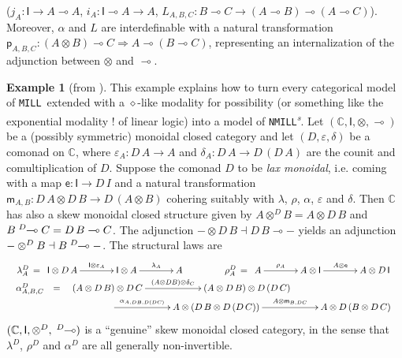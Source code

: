 \documentclass[submission,copyright,creativecommons]{eptcs}
\theoremstyle{definition}
\newtheorem{example}{Example}[section]
\newcommand{\ot}{\otimes}
\newcommand{\lolli}{\multimap}
\newcommand{\I}{\mathsf{I}}
\newcommand{\otd}{\ot^D}
\newcommand{\lollid}{\;\textsuperscript{$D$}\!\!\lolli}
\newcommand{\MILL}{\texttt{MILL}}
\newcommand{\NMILL}{\texttt{NMILL}}
\newcommand{\SkNMILL}{\NMILL\textsuperscript{\textit{s}}}
\begin{document}
($j_A : \I \to A \lolli A$, $i_A : \I \lolli A \to A$, $L_{A,B,C} : B \lolli C \to (A \lolli B) \lolli (A \lolli C)$).
Moreover, $\alpha$ and $L$ are interdefinable with a natural transformation $\mathsf{p}_{A , B , C} : (A \ot B) \lolli C \Rightarrow A \lolli (B \lolli C)$, representing an internalization of the adjunction between $\ot$ and $\lolli$.
\begin{example}[from \cite{uustalu:eilenberg-kelly:2020}]
This example explains how to turn every categorical model of \MILL\ extended with a $\diamond$-like modality for possibility (or something like the exponential modality ! of linear logic) into a model of \SkNMILL. 
Let $(\mathbb{C},\I,\ot,\lolli)$ be a (possibly symmetric) monoidal closed category and let $(D,\varepsilon, \delta)$ be a comonad on $\mathbb{C}$, where $\varepsilon_A : D\,A \to A$ and $\delta_A : D\,A \to D\,(D\,A)$ are the counit and comultiplication of $D$. Suppose the comonad $D$ to be \emph{lax monoidal}, i.e. coming with a map $\mathsf{e} : \I \to D\,I$ and a natural transformation $\mathsf{m}_{A,B} : D \,A \ot D\,B \to D\,(A \ot B)$ cohering suitably with $\lambda$, $\rho$, $\alpha$, $\varepsilon$ and $\delta$.
Then $\mathbb{C}$ has also a skew monoidal closed structure given by  $A \otd B = A \ot D\,B$ and $B \lollid C = D\,B \lolli C$. The adjunction $- \ot D\,B \dashv D\,B \lolli -$ yields an adjunction $- \otd B \dashv B \lollid -$. The structural laws are
\[
\begin{array}{c}
\lambda^D_A \, = \, \xymatrix@C=3pc{\I \ot D\,A \ar[r]^-{\I \ot \varepsilon_A} & \I \ot A \ar[r]^-{\lambda_A} & A} 
\hspace*{1.5cm}
\rho^D_A \, = \, \xymatrix@C=3pc{A \ar[r]^-{\rho_A} & A \ot \I \ar[r]^-{A \ot \mathsf{e}} & A \ot D\,\I} 
\\
\begin{array}{rcl}
\alpha^D_{A,B,C} & = & \xymatrix@C=5pc{(A \ot D\,B) \ot D\,C 
                   \ar[r]^-{(A \ot D B) \ot \delta_C}
                   & (A \ot D\,B) \ot D\,(D\,C)} \\
& & \hspace*{1.5cm} \xymatrix@C=5pc{\ar[r]^-{\alpha_{A,DB,D(DC)}}
                  & A \ot (D\,B \ot D\,(D\,C)) \ar[r]^-{A \ot \mathsf{m}_{B,DC}}
                  & A \ot D\,(B \ot D\,C)}
\end{array}
\end{array}
\]
$(\mathbb{C},\I,\otd,\lollid)$  is a ``genuine'' skew monoidal closed category, in the sense that $\lambda^D$, $\rho^D$ and $\alpha^D$ are all generally non-invertible.
\end{example}
\end{document}
